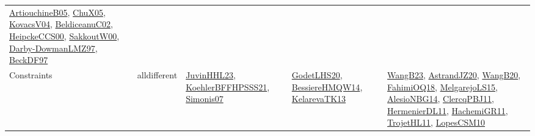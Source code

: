 {\begin{longtable}{lp{3cm}>{\raggedright}p{6cm}>{\raggedright}p{6cm}p{8cm}}
\href{papers/ArtiouchineB05.pdf}{ArtiouchineB05}\cite{ArtiouchineB05}, \href{papers/ChuX05.pdf}{ChuX05}\cite{ChuX05}, \href{papers/KovacsV04.pdf}{KovacsV04}\cite{KovacsV04}, \href{papers/BeldiceanuC02.pdf}{BeldiceanuC02}\cite{BeldiceanuC02}, \href{articles/HeipckeCCS00.pdf}{HeipckeCCS00}\cite{HeipckeCCS00}, \href{articles/SakkoutW00.pdf}{SakkoutW00}\cite{SakkoutW00}, \href{articles/Darby-DowmanLMZ97.pdf}{Darby-DowmanLMZ97}\cite{Darby-DowmanLMZ97}, \href{papers/BeckDF97.pdf}{BeckDF97}\cite{BeckDF97}\\
Constraints & alldifferent & \href{papers/JuvinHHL23.pdf}{JuvinHHL23}\cite{JuvinHHL23}, \href{articles/KoehlerBFFHPSSS21.pdf}{KoehlerBFFHPSSS21}\cite{KoehlerBFFHPSSS21}, \href{articles/Simonis07.pdf}{Simonis07}\cite{Simonis07} & \href{papers/GodetLHS20.pdf}{GodetLHS20}\cite{GodetLHS20}, \href{papers/BessiereHMQW14.pdf}{BessiereHMQW14}\cite{BessiereHMQW14}, \href{papers/KelarevaTK13.pdf}{KelarevaTK13}\cite{KelarevaTK13} & \href{papers/WangB23.pdf}{WangB23}\cite{WangB23}, \href{articles/AstrandJZ20.pdf}{AstrandJZ20}\cite{AstrandJZ20}, \href{papers/WangB20.pdf}{WangB20}\cite{WangB20}, \href{articles/FahimiOQ18.pdf}{FahimiOQ18}\cite{FahimiOQ18}, \href{papers/MelgarejoLS15.pdf}{MelgarejoLS15}\cite{MelgarejoLS15}, \href{papers/AlesioNBG14.pdf}{AlesioNBG14}\cite{AlesioNBG14}, \href{papers/ClercqPBJ11.pdf}{ClercqPBJ11}\cite{ClercqPBJ11}, \href{papers/HermenierDL11.pdf}{HermenierDL11}\cite{HermenierDL11}, \href{articles/HachemiGR11.pdf}{HachemiGR11}\cite{HachemiGR11}, \href{articles/TrojetHL11.pdf}{TrojetHL11}\cite{TrojetHL11}, \href{articles/LopesCSM10.pdf}{LopesCSM10}\cite{LopesCSM10}\\

\end{longtable}}
